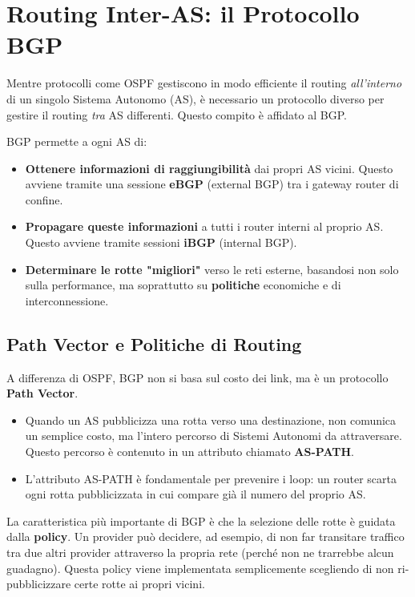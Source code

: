 \section{Routing Inter-AS: il Protocollo BGP}
Mentre protocolli come OSPF gestiscono in modo efficiente il routing \textit{all'interno} di un singolo Sistema Autonomo (AS), è necessario un protocollo diverso per gestire il routing \textit{tra} AS differenti. Questo compito è affidato al BGP.


BGP permette a ogni AS di:
\begin{itemize}
    \item \textbf{Ottenere informazioni di raggiungibilità} dai propri AS vicini. Questo avviene tramite una sessione \textbf{eBGP} (external BGP) tra i gateway router di confine.
    \item \textbf{Propagare queste informazioni} a tutti i router interni al proprio AS. Questo avviene tramite sessioni \textbf{iBGP} (internal BGP).
    \item \textbf{Determinare le rotte "migliori"} verso le reti esterne, basandosi non solo sulla performance, ma soprattutto su \textbf{politiche} economiche e di interconnessione.
\end{itemize}

\subsection{Path Vector e Politiche di Routing}
A differenza di OSPF, BGP non si basa sul costo dei link, ma è un protocollo \textbf{Path Vector}.
\begin{itemize}
    \item Quando un AS pubblicizza una rotta verso una destinazione, non comunica un semplice costo, ma l'intero percorso di Sistemi Autonomi da attraversare. Questo percorso è contenuto in un attributo chiamato \textbf{AS-PATH}.
    \item L'attributo AS-PATH è fondamentale per prevenire i loop: un router scarta ogni rotta pubblicizzata in cui compare già il numero del proprio AS.
\end{itemize}

La caratteristica più importante di BGP è che la selezione delle rotte è guidata dalla \textbf{policy}. Un provider può decidere, ad esempio, di non far transitare traffico tra due altri provider attraverso la propria rete (perché non ne trarrebbe alcun guadagno). Questa policy viene implementata semplicemente scegliendo di non ri-pubblicizzare certe rotte ai propri vicini.

